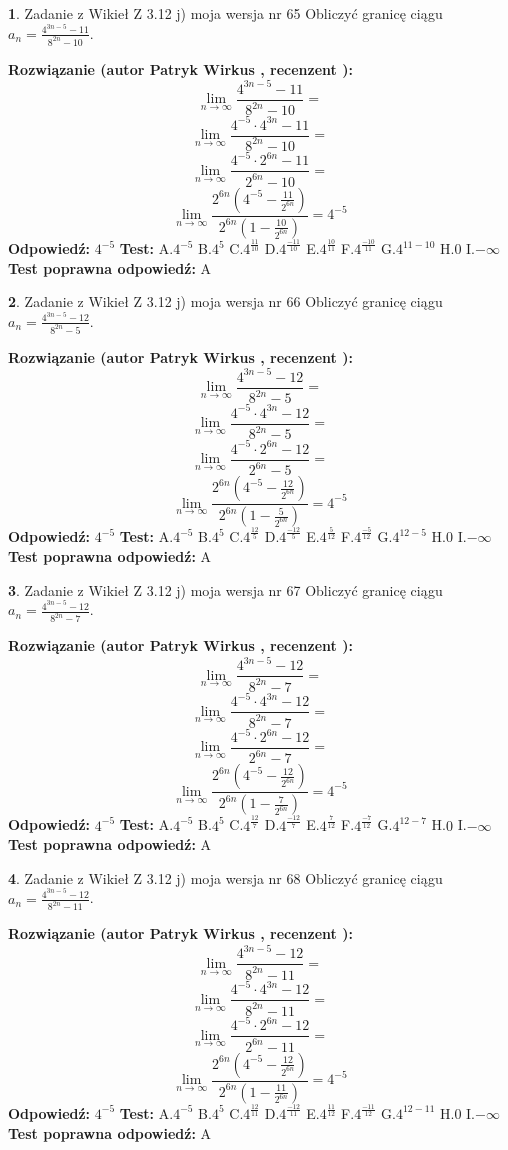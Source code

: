 \documentclass[12pt, a4paper]{article}
\theoremstyle{definition} %
\newtheorem{zad}{}
\newcommand{\zadStart}[1]{\begin{zad}#1\newline}
\newcommand{\zadStop}{\end{zad}}
\newcommand{\rozwStart}[2]{\noindent \textbf{Rozwiązanie (autor #1 , recenzent #2): }\newline}
\newcommand{\rozwStop}{\newline}
\newcommand{\odpStart}{\noindent \textbf{Odpowiedź:}\newline}
\newcommand{\odpStop}{\newline}
\newcommand{\testStart}{\noindent \textbf{Test:}\newline}
\newcommand{\testStop}{\newline}
\newcommand{\kluczStart}{\noindent \textbf{Test poprawna odpowiedź:}\newline}
\newcommand{\kluczStop}{\newline}
\begin{document}
\zadStart{Zadanie z Wikieł Z 3.12 j) moja wersja nr 65}
Obliczyć granicę ciągu $a_{n}=\frac{4^{3n-5}-11}{8^{2n}-10}$.
\zadStop
\rozwStart{Patryk Wirkus}{}
$$\lim\limits_{n\to\infty}\frac{4^{3n-5}-11}{8^{2n}-10}=$$
$$\lim\limits_{n\to\infty}\frac{4^{-5} \cdot 4^{3n}-11}{8^{2n}-10}=$$
$$\lim\limits_{n\to\infty}\frac{4^{-5} \cdot 2^{6n}-11}{2^{6n}-10}=$$
$$\lim\limits_{n\to\infty}\frac{2^{6n}(4^{-5} - \frac{11}{2^{6n}})}{2^{6n}(1-\frac{10}{2^{6n}})}= 4^{-5}$$
\rozwStop
\odpStart
$4^{-5}$
\odpStop
\testStart
A.$4^{-5}$
B.$4^{5}$
C.$4^{\frac{11}{10}}$
D.$4^{\frac{-11}{10}}$
E.$4^{\frac{10}{11}}$
F.$4^{\frac{-10}{11}}$
G.$4^{11-10}$
H.$0$
I.$-\infty$
\testStop
\kluczStart
A
\kluczStop



\zadStart{Zadanie z Wikieł Z 3.12 j) moja wersja nr 66}
Obliczyć granicę ciągu $a_{n}=\frac{4^{3n-5}-12}{8^{2n}-5}$.
\zadStop
\rozwStart{Patryk Wirkus}{}
$$\lim\limits_{n\to\infty}\frac{4^{3n-5}-12}{8^{2n}-5}=$$
$$\lim\limits_{n\to\infty}\frac{4^{-5} \cdot 4^{3n}-12}{8^{2n}-5}=$$
$$\lim\limits_{n\to\infty}\frac{4^{-5} \cdot 2^{6n}-12}{2^{6n}-5}=$$
$$\lim\limits_{n\to\infty}\frac{2^{6n}(4^{-5} - \frac{12}{2^{6n}})}{2^{6n}(1-\frac{5}{2^{6n}})}= 4^{-5}$$
\rozwStop
\odpStart
$4^{-5}$
\odpStop
\testStart
A.$4^{-5}$
B.$4^{5}$
C.$4^{\frac{12}{5}}$
D.$4^{\frac{-12}{5}}$
E.$4^{\frac{5}{12}}$
F.$4^{\frac{-5}{12}}$
G.$4^{12-5}$
H.$0$
I.$-\infty$
\testStop
\kluczStart
A
\kluczStop



\zadStart{Zadanie z Wikieł Z 3.12 j) moja wersja nr 67}
Obliczyć granicę ciągu $a_{n}=\frac{4^{3n-5}-12}{8^{2n}-7}$.
\zadStop
\rozwStart{Patryk Wirkus}{}
$$\lim\limits_{n\to\infty}\frac{4^{3n-5}-12}{8^{2n}-7}=$$
$$\lim\limits_{n\to\infty}\frac{4^{-5} \cdot 4^{3n}-12}{8^{2n}-7}=$$
$$\lim\limits_{n\to\infty}\frac{4^{-5} \cdot 2^{6n}-12}{2^{6n}-7}=$$
$$\lim\limits_{n\to\infty}\frac{2^{6n}(4^{-5} - \frac{12}{2^{6n}})}{2^{6n}(1-\frac{7}{2^{6n}})}= 4^{-5}$$
\rozwStop
\odpStart
$4^{-5}$
\odpStop
\testStart
A.$4^{-5}$
B.$4^{5}$
C.$4^{\frac{12}{7}}$
D.$4^{\frac{-12}{7}}$
E.$4^{\frac{7}{12}}$
F.$4^{\frac{-7}{12}}$
G.$4^{12-7}$
H.$0$
I.$-\infty$
\testStop
\kluczStart
A
\kluczStop



\zadStart{Zadanie z Wikieł Z 3.12 j) moja wersja nr 68}
Obliczyć granicę ciągu $a_{n}=\frac{4^{3n-5}-12}{8^{2n}-11}$.
\zadStop
\rozwStart{Patryk Wirkus}{}
$$\lim\limits_{n\to\infty}\frac{4^{3n-5}-12}{8^{2n}-11}=$$
$$\lim\limits_{n\to\infty}\frac{4^{-5} \cdot 4^{3n}-12}{8^{2n}-11}=$$
$$\lim\limits_{n\to\infty}\frac{4^{-5} \cdot 2^{6n}-12}{2^{6n}-11}=$$
$$\lim\limits_{n\to\infty}\frac{2^{6n}(4^{-5} - \frac{12}{2^{6n}})}{2^{6n}(1-\frac{11}{2^{6n}})}= 4^{-5}$$
\rozwStop
\odpStart
$4^{-5}$
\odpStop
\testStart
A.$4^{-5}$
B.$4^{5}$
C.$4^{\frac{12}{11}}$
D.$4^{\frac{-12}{11}}$
E.$4^{\frac{11}{12}}$
F.$4^{\frac{-11}{12}}$
G.$4^{12-11}$
H.$0$
I.$-\infty$
\testStop
\kluczStart
A
\kluczStop
\end{document}
